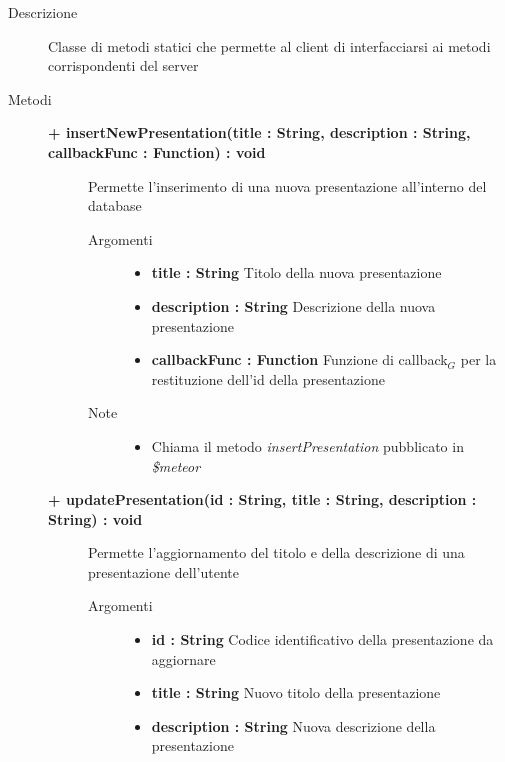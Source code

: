 \begin{description}
\item[Descrizione] \hfill
	Classe di metodi statici che permette al client di interfacciarsi ai metodi corrispondenti del server
	
	
\item[Metodi] \hfill

	\begin{description}
		\item[\textbf{\color{blue}+ insertNewPresentation(title : String, description : String, callbackFunc : Function) : void			}] \hfill
			Permette l'inserimento di una nuova presentazione all'interno del database
			
		\begin{description}
			\item[Argomenti] \hfill
				\begin{itemize}
				
					\item \textbf{title : String			} \hfill
					Titolo della nuova presentazione
					\item \textbf{description : String			} \hfill
					Descrizione della nuova presentazione
					\item \textbf{callbackFunc : Function			} \hfill
					Funzione di callback$_G$ per la restituzione dell'id della presentazione
					
				\end{itemize}
			\item[Note] \hfill
			\begin{itemize}
					\item Chiama il metodo \textit{insertPresentation} pubblicato in \textit{\$meteor}
			\end{itemize}
		\end{description}
	\end{description}



	\begin{description}
		\item[\textbf{\color{blue}+ updatePresentation(id : String, title : String, description : String) : void			}] \hfill
			Permette l'aggiornamento del titolo e della descrizione di una presentazione dell'utente
			
		\begin{description}
			\item[Argomenti] \hfill
				\begin{itemize}
					\item \textbf{id : String			} \hfill
					Codice identificativo della presentazione da aggiornare
					\item \textbf{title : String			} \hfill
					Nuovo titolo della presentazione
					\item \textbf{description : String			} \hfill
					Nuova descrizione della presentazione
					

\end{itemize}
\end{description}
\end{description}
\end{description}
